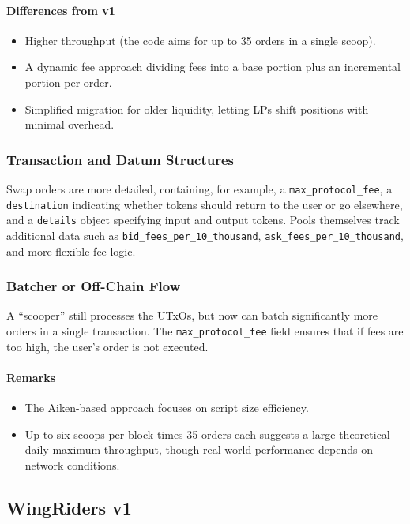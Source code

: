 \documentclass{article}
\begin{document}
\paragraph{Differences from v1}
\begin{itemize}
    \item Higher throughput (the code aims for up to 35 orders in a single scoop).
    \item A dynamic fee approach dividing fees into a base portion plus an incremental portion per order.
    \item Simplified migration for older liquidity, letting LPs shift positions with minimal overhead.
\end{itemize}

\subsubsection{Transaction and Datum Structures}
Swap orders are more detailed, containing, for example, a \texttt{max\_protocol\_fee}, a \texttt{destination} indicating whether tokens should return to the user or go elsewhere, and a \texttt{details} object specifying input and output tokens. Pools themselves track additional data such as \texttt{bid\_fees\_per\_10\_thousand}, \texttt{ask\_fees\_per\_10\_thousand}, and more flexible fee logic.

\subsubsection{Batcher or Off-Chain Flow}
A ``scooper'' still processes the UTxOs, but now can batch significantly more orders in a single transaction. The \texttt{max\_protocol\_fee} field ensures that if fees are too high, the user’s order is not executed.

\paragraph{Remarks}
\begin{itemize}
    \item The Aiken-based approach focuses on script size efficiency.
    \item Up to six scoops per block times 35 orders each suggests a large theoretical daily maximum throughput, though real-world performance depends on network conditions.
\end{itemize}



\subsection{WingRiders v1}
\label{sec:wingriders_v1}
\end{document}
